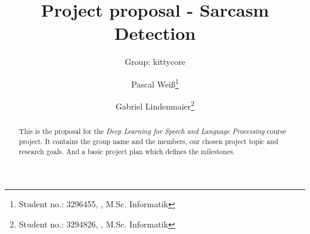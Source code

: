 \documentclass[utf8, english]{lni}
\begin{document}
\title[Proposal]{Project proposal - Sarcasm Detection}
\subtitle{Group: kittycore} %
\author[Pascal Weiß, Gabriel Lindenmaier]{%
Pascal Weiß\footnote{Student no.: 3296455, , M.Sc. Informatik} \and%
Gabriel Lindenmaier\footnote{Student no.: 3294826, , M.Sc. Informatik}}
\maketitle
\begin{abstract}
This is the proposal for the \emph{Deep Learning for Speech and Language Processing} course project. It contains the group name and the members, our chosen project topic and research goals. And a basic project plan which defines the milestones.
\end{abstract}
\end{document}
